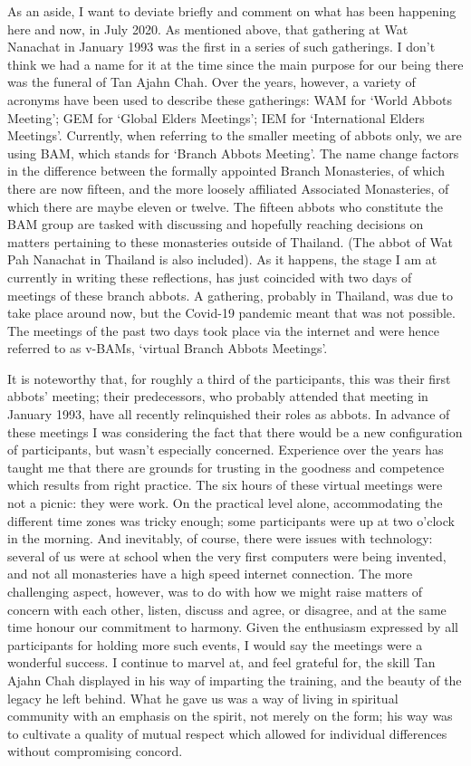As an aside, I want to deviate briefly and comment on what has been
happening here and now, in July 2020. As mentioned above, that gathering
at Wat Nanachat in January 1993 was the first in a series of such
gatherings. I don't think we had a name for it at the time since the
main purpose for our being there was the funeral of Tan Ajahn Chah. Over
the years, however, a variety of acronyms have been used to describe
these gatherings: WAM for `World Abbots Meeting'; GEM for `Global Elders
Meetings'; IEM for `International Elders Meetings'. Currently, when
referring to the smaller meeting of abbots only, we are using BAM, which
stands for `Branch Abbots Meeting'. The name change factors in the
difference between the formally appointed Branch Monasteries\cite{branches},
of which there are now fifteen, and the more loosely
affiliated Associated Monasteries, of which there are maybe eleven or
twelve. The fifteen abbots who constitute the BAM group are tasked with
discussing and hopefully reaching decisions on matters pertaining to
these monasteries outside of Thailand. (The abbot of Wat Pah Nanachat in
Thailand is also included). As it happens, the stage I am at currently
in writing these reflections, has just coincided with two days of
meetings of these branch abbots. A gathering, probably in Thailand, was
due to take place around now, but the Covid-19 pandemic meant that was
not possible. The meetings of the past two days took place via the
internet and were hence referred to as v-BAMs, `virtual Branch Abbots
Meetings'.

It is noteworthy that, for roughly a third of the participants, this was
their first abbots' meeting; their predecessors, who probably attended
that meeting in January 1993, have all recently relinquished their roles
as abbots. In advance of these meetings I was considering the fact that
there would be a new configuration of participants, but wasn't
especially concerned. Experience over the years has taught me that there
are grounds for trusting in the goodness and competence which results
from right practice. The six hours of these virtual meetings were not a
picnic: they were work. On the practical level alone, accommodating the
different time zones was tricky enough; some participants were up at two
o'clock in the morning. And inevitably, of course, there were issues
with technology: several of us were at school when the very first
computers were being invented, and not all monasteries have a high speed
internet connection. The more challenging aspect, however, was to do
with how we might raise matters of concern with each other, listen,
discuss and agree, or disagree, and at the same time honour our
commitment to harmony. Given the enthusiasm expressed by all
participants for holding more such events, I would say the meetings were
a wonderful success. I continue to marvel at, and feel grateful for, the
skill Tan Ajahn Chah displayed in his way of imparting the training, and
the beauty of the legacy he left behind. What he gave us was a way of
living in spiritual community with an emphasis on the spirit, not merely
on the form; his way was to cultivate a quality of mutual respect which
allowed for individual differences without compromising concord.


